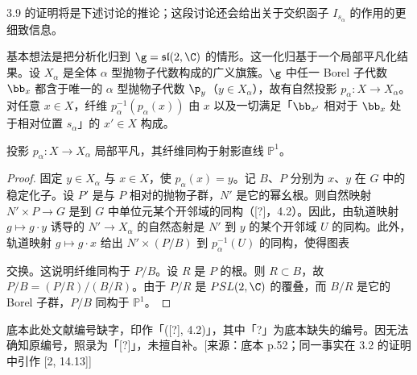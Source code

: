 3.9 的证明将是下述讨论的推论；这段讨论还会给出关于交织函子 $I_{s_\alpha}$ 的作用的更细致信息。

基本想法是把分析化归到 $\g=\mathfrak{sl}(2,\C)$ 的情形。这一化归基于一个局部平凡化结果。设 $X_\alpha$ 是全体 $\alpha$ 型抛物子代数构成的广义旗簇。$\g$ 中任一 Borel 子代数 $\bb_x$ 都含于唯一的 $\alpha$ 型抛物子代数 $\p_y$（$y\in X_\alpha$），故有自然投影 $p_\alpha:X\to X_\alpha$。对任意 $x\in X$，纤维 $p_\alpha^{-1}(p_\alpha(x))$ 由 $x$ 以及一切满足「$\bb_{x'}$ 相对于 $\bb_x$ 处于相对位置 $s_\alpha$」的 $x'\in X$ 构成。

\begin{lemma}\label{lem:03.3.10}
投影 $p_\alpha:X\to X_\alpha$ 局部平凡，其纤维同构于射影直线 $\mathbb{P}^1$。
\end{lemma}

\begin{proof}
固定 $y\in X_\alpha$ 与 $x\in X$，使 $p_\alpha(x)=y$。记 $B$、$P$ 分别为 $x$、$y$ 在 $G$ 中的稳定化子。设 $P'$ 是与 $P$ 相对的抛物子群，$N'$ 是它的幂幺根。则自然映射 $N'\times P\to G$ 是到 $G$ 中单位元某个开邻域的同构（[?]，4.2）。因此，由轨道映射 $g\mapsto g\cdot y$ 诱导的 $N'\to X_\alpha$ 的自然态射是 $N'$ 到 $y$ 的某个开邻域 $U$ 的同构。此外，轨道映射 $g\mapsto g\cdot x$ 给出 $N'\times(P/B)$ 到 $p_\alpha^{-1}(U)$ 的同构，使得图表
\begin{center}
\end{center}
交换。这说明纤维同构于 $P/B$。设 $R$ 是 $P$ 的根。则 $R\subset B$，故 $P/B=(P/R)/(B/R)$。由于 $P/R$ 是 $PSL(2,\C)$ 的覆叠，而 $B/R$ 是它的 Borel 子群，$P/B$ 同构于 $\mathbb{P}^1$。
\end{proof}
\begin{annote}
底本此处文献编号缺字，印作「([?], 4.2)」，其中「?」为底本缺失的编号。因无法确知原编号，照录为「[?]」，未擅自补。[来源：底本 p.52；同一事实在 3.2 的证明中引作 [2, 14.13]]
\end{annote}


